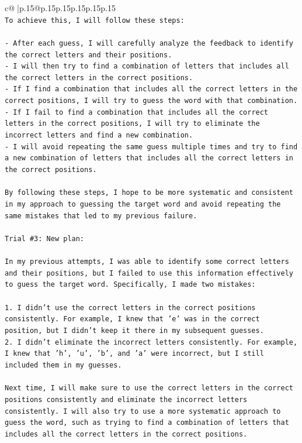 \documentclass{article}
\begin{document}
{\begin{supertabular}{c@{$\;$}|p{.15\linewidth}@{}p{.15\linewidth}p{.15\linewidth}p{.15\linewidth}p{.15\linewidth}p{.15\linewidth}}
{{{\\ 
\texttt{To achieve this, I will follow these steps:} \\
\\ 
\texttt{{-} After each guess, I will carefully analyze the feedback to identify the correct letters and their positions.} \\
\texttt{{-} I will then try to find a combination of letters that includes all the correct letters in the correct positions.} \\
\texttt{{-} If I find a combination that includes all the correct letters in the correct positions, I will try to guess the word with that combination.} \\
\texttt{{-} If I fail to find a combination that includes all the correct letters in the correct positions, I will try to eliminate the incorrect letters and find a new combination.} \\
\texttt{{-} I will avoid repeating the same guess multiple times and try to find a new combination of letters that includes all the correct letters in the correct positions.} \\
\\ 
\texttt{By following these steps, I hope to be more systematic and consistent in my approach to guessing the target word and avoid repeating the same mistakes that led to my previous failure.} \\
\\ 
\texttt{Trial \#3: New plan: } \\
\\ 
\texttt{In my previous attempts, I was able to identify some correct letters and their positions, but I failed to use this information effectively to guess the target word. Specifically, I made two mistakes: } \\
\\ 
\texttt{1. I didn't use the correct letters in the correct positions consistently. For example, I knew that 'e' was in the correct position, but I didn't keep it there in my subsequent guesses. } \\
\texttt{2. I didn't eliminate the incorrect letters consistently. For example, I knew that 'h', 'u', 'b', and 'a' were incorrect, but I still included them in my guesses.} \\
\\ 
\texttt{Next time, I will make sure to use the correct letters in the correct positions consistently and eliminate the incorrect letters consistently. I will also try to use a more systematic approach to guess the word, such as trying to find a combination of letters that includes all the correct letters in the correct positions. } \\
}}}
\end{supertabular}}
\end{document}

